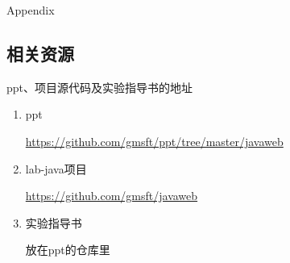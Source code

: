 \documentclass{beamer}
\begin{document}
\begin{frame}
\Huge{\centerline{Appendix}}
\end{frame}

\subsection{相关资源}
\begin{frame}
\begin{block}{ppt、项目源代码及实验指导书的地址}
\begin{enumerate}
\item
ppt

\url{https://github.com/gmsft/ppt/tree/master/javaweb}
\item
lab-java项目

\url{https://github.com/gmsft/javaweb}

\item
实验指导书

放在ppt的仓库里
\end{enumerate}
\end{block}
\end{frame}



\end{document}
